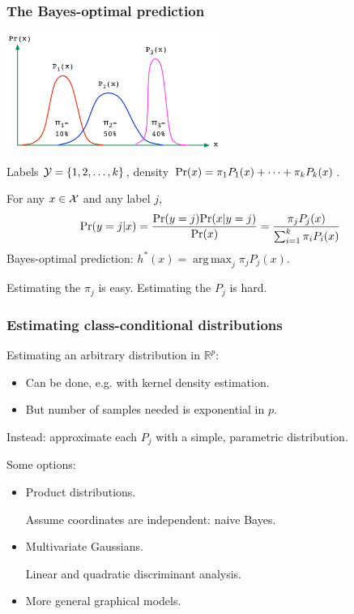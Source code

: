 \documentclass[smaller,handout]{beamer}
\def\X{{\cal X}}
\def\Y{{\cal Y}}
\def\R{{\mathbb R}}
\def\darkred{\color{red!70!black}}
\def\darkgreen{\color{green!60!black}}
\DeclareMathOperator*{\argmax}{arg\,max}
\def\vone{{\vskip.1in}}
\def\v2{{\vskip.2in}}
\def\R{{\mathbb R}}
\def\pr{{\mbox{\rm Pr}}}
\begin{document}
\begin{frame}
\frametitle{The Bayes-optimal prediction}

\begin{center}
\includegraphics[width=2.75in]{mixture.pdf}
\end{center}

{\darkred Labels $\Y = \{1,2,\ldots,k\}$, density
$\pr(x) = \pi_1 P_1(x) + \cdots + \pi_k P_k(x)$.}

\pause\vone
For any $x \in \X$ and any label $j$,
$$ \pr(y = j | x)
= \frac{\pr(y=j) \pr(x|y=j)}{\pr(x)}
= \frac{\pi_j P_j(x)}{\sum_{i=1}^k \pi_i P_i(x)}
$$
\pause Bayes-optimal prediction:
$h^*(x) = \argmax_j \pi_j P_j(x)$.

\pause\vone
\alert{Estimating the $\pi_j$ is easy. Estimating the $P_j$ is hard.}

\end{frame}

\begin{frame}
\frametitle{Estimating class-conditional distributions}

{\darkred Estimating an arbitrary distribution in $\R^p$:}
\begin{itemize}
\item {\darkred Can be done, e.g. with kernel density estimation.}
\item {\darkred But number of samples needed is exponential in $p$.}
\end{itemize}

\pause\v2
\alert{Instead: approximate each $P_j$ with a simple, parametric distribution.} 

\pause\v2
Some options:
\begin{itemize}
\item Product distributions.

{\darkgreen Assume coordinates are independent: naive Bayes.}

\item Multivariate Gaussians.

{\darkgreen Linear and quadratic discriminant analysis.}

\item More general graphical models.

\end{itemize}
\end{frame}
\end{document}
